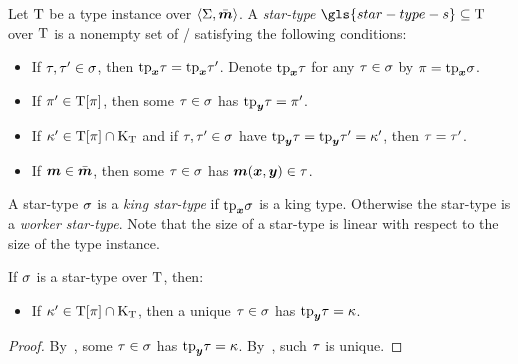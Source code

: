 \begin{definition}
Let $\mathrm{T}$ be a type instance over $\left\langle \mathrm{\Sigma},\bar{\bm{m}} \right\rangle$.
A \emph{star-type} $\gls{star-type-s} \subseteq \TI$ over $\mathrm{T}$ is a
nonempty set of \twotypes/ satisfying the following conditions:
\begin{itemize}
  \item[\condstpx]\label{cond:stpx}
  If $\tau, {\tau'} \in \sigma$, then $\mathrm{tp}_{\bm{x}}\tau = \mathrm{tp}_{\bm{x}}{\tau'}$.
  Denote $\mathrm{tp}_{\bm{x}}\tau$ for any $\tau \in \sigma$ by $\pi=\mathrm{tp}_{\bm{x}}\sigma$.
  
  \item[\condstppy]\label{cond:stppy}
  If ${\pi'} \in \mathrm{T}[\pi]$, then some $\tau\in\sigma$ has
  $\mathrm{tp}_{\bm{y}}\tau = {\pi'}$.
  
  \item[\condstpky]\label{cond:stpky}
  If ${\kappa'} \in \mathrm{T}[\pi]\cap{\mathrm{K}}_{\mathrm{T}}$
  and if $\tau,{\tau'} \in \sigma$ have $\mathrm{tp}_{\bm{y}}\tau = \mathrm{tp}_{\bm{y}}{\tau'} = {\kappa'}$,
  then $\tau = {\tau'}$.
  
  \item[\condstpm]\label{cond:stpm}
  If $\bm{m} \in \bar{\bm{m}}$, then some $\tau\in\sigma$ has $\bm{m}(\bm{x},\bm{y}) \in \tau$.
\end{itemize}
\end{definition}
A star-type $\sigma$ is a \emph{king star-type} if $\mathrm{tp}_{\bm{x}}\sigma$ is a king type.
Otherwise the star-type is a \emph{worker star-type}.
Note that the size of a star-type is linear with respect to the size of the type
instance.
\begin{remark}
If $\sigma$ is a star-type over $\mathrm{T}$, then:
\begin{itemize}
  \item[\condstpkyu]\label{cond:stpkyu}
  If ${\kappa'} \in \mathrm{T}[\pi]\cap{\mathrm{K}}_{\mathrm{T}}$,
  then a unique $\tau\in\sigma$ has $\mathrm{tp}_{\bm{y}}\tau = \kappa$.
\end{itemize}
\end{remark}
\begin{proof}
By~, some $\tau\in\sigma$ has $\mathrm{tp}_{\bm{y}}\tau = \kappa$.
By~, such $\tau$ is unique.
\end{proof}

